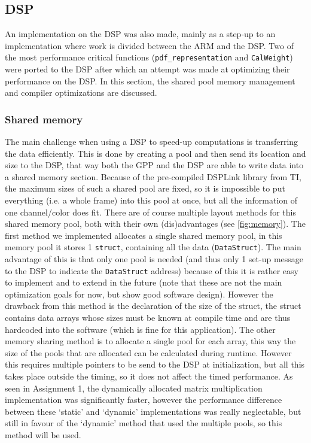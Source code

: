 \documentclass[final]{article}
\begin{document}
\subsection{DSP}
An implementation on the DSP was also made, mainly as a step-up to an implementation where work is divided between the ARM and the DSP.
Two of the most performance critical functions (\texttt{pdf\_representation} and \texttt{CalWeight}) were ported to the DSP after which an attempt was made at optimizing their performance on the DSP.
In this section, the shared pool memory management and compiler optimizations are discussed.

\subsubsection{Shared memory}
The main challenge when using a DSP to speed-up computations is transferring the data efficiently.
This is done by creating a pool and then send its location and size to the DSP, that way both the GPP and the DSP are able to write data into a shared memory section.
Because of the pre-compiled DSPLink library from TI, the maximum sizes of such a shared pool are fixed, so it is impossible to put everything (i.e. a whole frame) into this pool at once, but all the information of one channel/color does fit.
There are of course multiple layout methods for this shared memory pool, both with their own (dis)advantages (see \autoref{fig:memory}).
The first method we implemented allocates a single shared memory pool, in this memory pool it stores 1 \texttt{struct}, containing all the data (\texttt{DataStruct}).
The main advantage of this is that only one pool is needed (and thus only 1 set-up message to the DSP to indicate the \texttt{DataStruct} address) because of this it is rather easy to implement and to extend in the future (note that these are not the main optimization goals for now, but show good software design).
However the drawback from this method is the declaration of the size of the struct, the struct contains data arrays whose sizes must be known at compile time and are thus hardcoded into the software (which is fine for this application).
The other memory sharing method is to allocate a single pool for each array, this way the size of the pools that are allocated can be calculated during runtime.
However this requires multiple pointers to be send to the DSP at initialization, but all this takes place outside the timing, so it does not affect the timed performance.
As seen in Assignment 1, the dynamically allocated matrix multiplication implementation was significantly faster, however the performance difference between these `static' and `dynamic' implementations was really neglectable, but still in favour of the `dynamic' method that used the multiple pools, so this method will be used.
\end{document}
